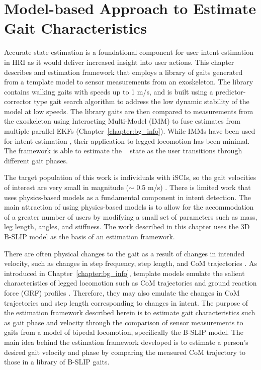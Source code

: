 \chapter{Model-based Approach to Estimate Gait Characteristics} \label{chapter:IMM}
Accurate state estimation is a foundational component for user intent estimation in HRI as it would deliver increased insight into user actions. This chapter describes and estimation framework that employs a library of gaits generated from a template model to sensor measurements from an exoskeleton. The library contains walking gaits with speeds up to 1 m/s, and is built using a predictor-corrector type gait search algorithm to address the low dynamic stability of the model at low speeds. The library gaits are then compared to measurements from the exoskeleton using Interacting Multi-Model (IMM) to fuse estimates from multiple parallel EKFs (Chapter~\ref{chapter:bg_info}). While IMMs have been used for intent estimation \cite{chaandar2015human}, their application to legged locomotion has been minimal. The framework is able to estimate the \com~ state as the user transitions through different gait phases.

The target population of this work is individuals with iSCIs, so the gait velocities of interest are very small in magnitude ($ \sim $ 0.5 m/s) \cite{nymark2005electromyographic}. There is limited work that uses physics-based models as a fundamental component in intent detection. The main attraction of using physics-based models is to allow for the accommodation of a greater number of users by modifying a small set of parameters such as mass, leg length, angles, and stiffness. The work described in this chapter uses the 3D B-SLIP model \cite{liu2015dynamic} as the basis of an estimation framework.

There are often physical changes to the gait as a result of changes in intended velocity, such as changes in step frequency, step length, and CoM trajectories \cite{kuo2001simple}. As introduced in Chapter~\ref{chapter:bg_info}, template models emulate the salient characteristics of legged locomotion such as CoM trajectories and ground reaction force (GRF) profiles \cite{mochon1980ballistic}. Therefore, they may also emulate the changes in CoM trajectories and step length corresponding to changes in intent. The purpose of the estimation framework described herein is to estimate gait characteristics such as gait phase and velocity through the comparison of sensor measurements to gaits from a model of bipedal locomotion, specifically the B-SLIP model. The main idea behind the estimation framework developed is to estimate a person's desired gait velocity and phase by comparing the measured CoM trajectory to those in a library of B-SLIP gaits. 


